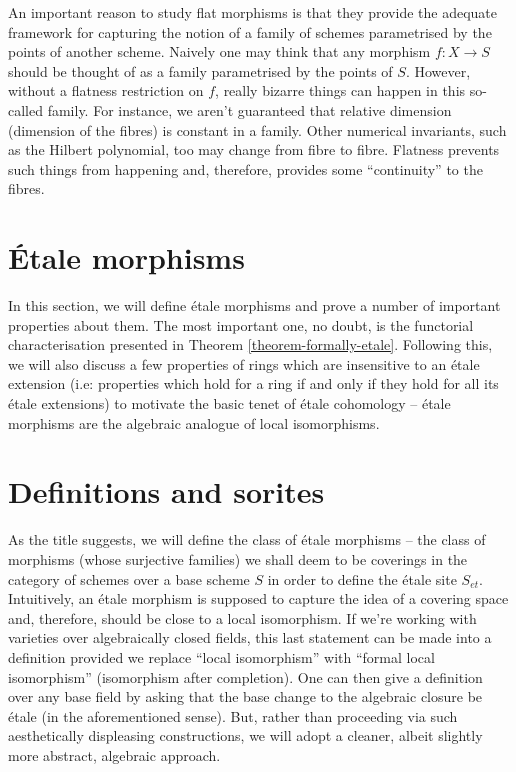 \noindent
An important reason to study flat morphisms is that they provide the adequate
framework for capturing the notion of a family of schemes parametrised by the
points of another scheme. Naively one may think that any morphism $f:X \to S$
should be thought of as a family parametrised by the points of $S$. However,
without a flatness restriction on $f$, really bizarre things can happen in
this so-called family. For instance, we aren't guaranteed that relative
dimension (dimension of the fibres) is constant in a family. Other numerical
invariants, such as the Hilbert polynomial, too may change from fibre to
fibre. Flatness prevents such things from happening and, therefore, provides
some ``continuity'' to the fibres. 

\section{\'Etale morphisms}
\label{section-etale-moprhisms}

\noindent
In this section, we will define \'etale morphisms and prove a number of
important properties about them. The most important one, no doubt, is the
functorial characterisation presented in Theorem \ref{theorem-formally-etale}.
Following this, we will also discuss a few properties of rings which are
insensitive to an \'etale extension (i.e: properties which hold for a ring
if and only if they hold for all its \'etale extensions) to motivate the basic
tenet of \'etale cohomology -- \'etale morphisms are the algebraic analogue of
local isomorphisms.

\section{Definitions and sorites}
\label{section-etale-definition}

\noindent
As the title suggests, we will define the class of \'etale morphisms -- the
class of morphisms (whose surjective families) we shall deem to be coverings
in the category of schemes over a base scheme $S$ in order to define the
\'etale site $S_{et}$. Intuitively, an \'etale morphism is supposed to
capture the idea of a covering space and, therefore, should be close to a
local isomorphism. If we're working with varieties over algebraically closed
fields, this last statement can be made into a definition provided we replace
``local isomorphism'' with ``formal local isomorphism'' (isomorphism after
completion). One can then give a definition over any base field by asking
that the base change to the algebraic closure be \'etale (in the
aforementioned sense). But, rather than proceeding via such aesthetically
displeasing constructions, we will adopt a cleaner, albeit slightly more
abstract, algebraic approach.


